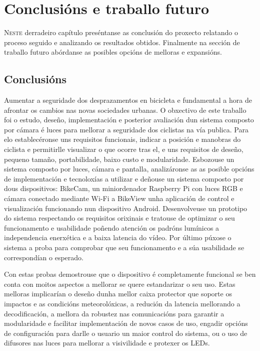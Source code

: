 \chapter{Conclusións e traballo futuro}
\label{chap:conclusions}
\lettrine{N}{este} derradeiro capítulo preséntanse as conclusión do proxecto relatando o proceso seguido e analizando os resultados obtidos. Finalmente na sección de traballo futuro abórdanse as posibles opcións de melloras e expansións.

\section{Conclusións}
Aumentar a seguridade dos desprazamentos en bicicleta e fundamental a hora de afrontar os cambios nas novas sociedades urbanas. O obxectivo de este traballo  foi o estudo, deseño, implementación e posterior avaliación dun sistema composto por cámara é luces para mellorar a seguridade dos ciclistas na vía publica. Para elo establecéronse uns requisitos funcionais, indicar a posición e manobras do ciclista e permitirlle visualizar o que ocorre tras el, e uns requisitos de deseño, pequeno tamaño, portabilidade, baixo custo e modularidade. Esbozouse un sistema composto por luces, cámara e pantalla, analizáronse as as posible opcións de implementación e tecnoloxías a utilizar e deñouse un sistema composto por dous dispositivos: BikeCam, un miniordenador Raspberry Pi con luces RGB e cámara conectado mediante Wi-Fi a BikeView unha aplicación de control e visualización funcionando nun dispositivo Android. Desenvolveuse un prototipo do sistema respectando os requisitos orixinais e tratouse de optimizar o seu funcionamento e usabilidade poñendo atención os padróns lumínicos a independencia enerxética e a baixa latencia do vídeo. Por último púxose o sistema a proba para comprobar que seu funcionamento e a súa usabilidade se correspondían o esperado.

Con estas probas demostrouse que o dispositivo é completamente funcional se ben conta con moitos aspectos a mellorar se quere estandarizar o seu uso. Estas melloras implicarían o deseño dunha mellor caixa protector que soporte os impactos e as condicións meteorolóxicas, a redución da latencia mellorando a decodificación, a mellora da robustez nas comunicacións para garantir a modularidade e facilitar implementación de novos casos de uso, engadir opcións de configuración para darlle o usuario un maior control do sistema, ou o uso de difusores nas luces para mellorar a visivilidade e protexer os LEDs.

